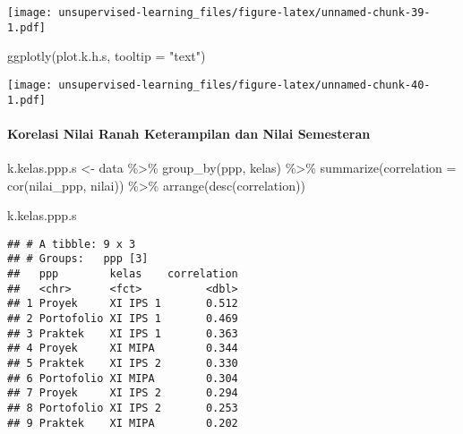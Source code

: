 \documentclass[
]{article}
\newenvironment{Shaded}{\begin{snugshade}}{\end{snugshade}}
\newcommand{\AttributeTok}[1]{\textcolor[rgb]{0.77,0.63,0.00}{#1}}
\newcommand{\FunctionTok}[1]{\textcolor[rgb]{0.00,0.00,0.00}{#1}}
\newcommand{\NormalTok}[1]{#1}
\newcommand{\OtherTok}[1]{\textcolor[rgb]{0.56,0.35,0.01}{#1}}
\newcommand{\SpecialCharTok}[1]{\textcolor[rgb]{0.00,0.00,0.00}{#1}}
\newcommand{\StringTok}[1]{\textcolor[rgb]{0.31,0.60,0.02}{#1}}
\begin{document}
\texttt{[image: unsupervised-learning\_files/figure-latex/unnamed-chunk-39-1.pdf]}

\begin{Shaded}
\begin{Highlighting}[]
\FunctionTok{ggplotly}\NormalTok{(plot.k.h.s, }\AttributeTok{tooltip =} \StringTok{"text"}\NormalTok{)}
\end{Highlighting}
\end{Shaded}

\texttt{[image: unsupervised-learning\_files/figure-latex/unnamed-chunk-40-1.pdf]}

\hypertarget{korelasi-nilai-ranah-keterampilan-dan-nilai-semesteran}{%
\paragraph{Korelasi Nilai Ranah Keterampilan dan Nilai
Semesteran}\label{korelasi-nilai-ranah-keterampilan-dan-nilai-semesteran}}

\begin{Shaded}
\begin{Highlighting}[]
\NormalTok{k.kelas.ppp.s }\OtherTok{\textless{}{-}} 
\NormalTok{  data }\SpecialCharTok{\%\textgreater{}\%} 
  \FunctionTok{group\_by}\NormalTok{(ppp, kelas) }\SpecialCharTok{\%\textgreater{}\%} 
  \FunctionTok{summarize}\NormalTok{(}\AttributeTok{correlation =} \FunctionTok{cor}\NormalTok{(nilai\_ppp, nilai)) }\SpecialCharTok{\%\textgreater{}\%} 
  \FunctionTok{arrange}\NormalTok{(}\FunctionTok{desc}\NormalTok{(correlation))}

\NormalTok{k.kelas.ppp.s}
\end{Highlighting}
\end{Shaded}

\begin{verbatim}
## # A tibble: 9 x 3
## # Groups:   ppp [3]
##   ppp        kelas    correlation
##   <chr>      <fct>          <dbl>
## 1 Proyek     XI IPS 1       0.512
## 2 Portofolio XI IPS 1       0.469
## 3 Praktek    XI IPS 1       0.363
## 4 Proyek     XI MIPA        0.344
## 5 Praktek    XI IPS 2       0.330
## 6 Portofolio XI MIPA        0.304
## 7 Proyek     XI IPS 2       0.294
## 8 Portofolio XI IPS 2       0.253
## 9 Praktek    XI MIPA        0.202
\end{verbatim}
\end{document}
